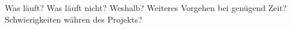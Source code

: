 Was  l\"auft? Was  l\"auft  nicht? Weshalb? Weiteres Vorgehen  bei  gen\"ugend
Zeit? Schwierigkeiten w\"ahren des Projekts?
